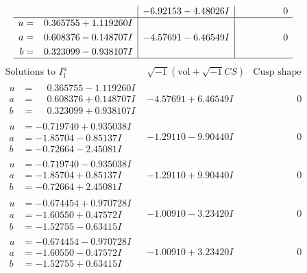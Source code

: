\documentclass[1p]{elsarticle_modified}
\theoremstyle{definition}
\newcommand{\I}{\sqrt{-1}}
\begin{document}
$$\begin{array}{c|c|c}
 & -6.92153 - 4.48026 I & \phantom{-0.000000 } 0 \\ \hline\begin{aligned}
u &= \phantom{-}0.365755 + 1.119260 I \\
a &= \phantom{-}0.608376 - 0.148707 I \\
b &= \phantom{-}0.323099 - 0.938107 I\end{aligned}
 & -4.57691 - 6.46549 I & \phantom{-0.000000 } 0\\
 \hline 
 \end{array}$$\newpage$$\begin{array}{c|c|c}  
\text{Solutions to }I^u_{1}& \I (\text{vol} + \sqrt{-1}CS) & \text{Cusp shape}\\
 \hline 
\begin{aligned}
u &= \phantom{-}0.365755 - 1.119260 I \\
a &= \phantom{-}0.608376 + 0.148707 I \\
b &= \phantom{-}0.323099 + 0.938107 I\end{aligned}
 & -4.57691 + 6.46549 I & \phantom{-0.000000 } 0 \\ \hline\begin{aligned}
u &= -0.719740 + 0.935038 I \\
a &= -1.85704 - 0.85137 I \\
b &= -0.72664 - 2.45081 I\end{aligned}
 & -1.29110 - 9.90440 I & \phantom{-0.000000 } 0 \\ \hline\begin{aligned}
u &= -0.719740 - 0.935038 I \\
a &= -1.85704 + 0.85137 I \\
b &= -0.72664 + 2.45081 I\end{aligned}
 & -1.29110 + 9.90440 I & \phantom{-0.000000 } 0 \\ \hline\begin{aligned}
u &= -0.674454 + 0.970728 I \\
a &= -1.60550 + 0.47572 I \\
b &= -1.52755 - 0.63415 I\end{aligned}
 & -1.00910 - 3.23420 I & \phantom{-0.000000 } 0 \\ \hline\begin{aligned}
u &= -0.674454 - 0.970728 I \\
a &= -1.60550 - 0.47572 I \\
b &= -1.52755 + 0.63415 I\end{aligned}
 & -1.00910 + 3.23420 I & \phantom{-0.000000 } 0 \\ \hline\begin{aligned}

\end{aligned}
\end{array}$$
\end{document}
